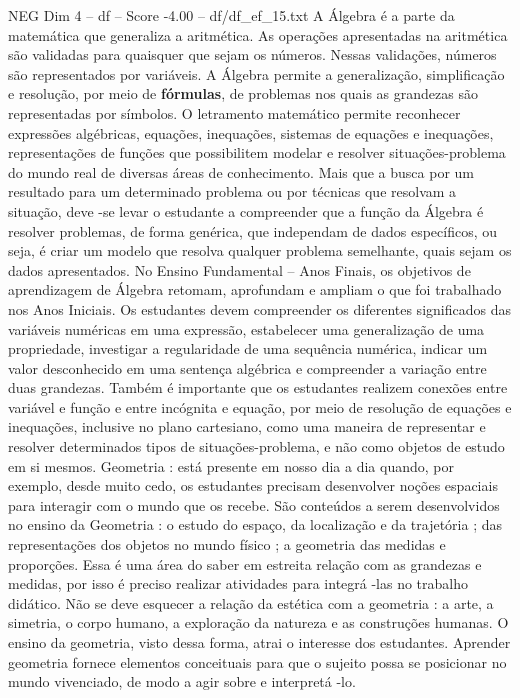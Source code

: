 \begin{textsample}{NEG Dim 4 – df – Score -4.00 – df/df\_ef\_15.txt}
A Álgebra é a parte da matemática que generaliza a aritmética.
As operações apresentadas na aritmética são validadas para quaisquer que sejam os números.
Nessas validações, números são representados por variáveis.
A Álgebra permite a generalização, simplificação e resolução, por meio de \textbf{fórmulas}, de problemas nos quais as grandezas são representadas por símbolos.
O letramento matemático permite reconhecer expressões algébricas, equações, inequações, sistemas de equações e inequações, representações de funções que possibilitem modelar e resolver situações-problema do mundo real de diversas áreas de conhecimento.
Mais que a busca por um resultado para um determinado problema ou por técnicas que resolvam a situação, deve -se levar o estudante a compreender que a função da Álgebra é resolver problemas, de forma genérica, que independam de dados específicos, ou seja, é criar um modelo que resolva qualquer problema semelhante, quais sejam os dados apresentados.
No Ensino Fundamental – Anos Finais, os objetivos de aprendizagem de Álgebra retomam, aprofundam e ampliam o que foi trabalhado nos Anos Iniciais.
Os estudantes devem compreender os diferentes significados das variáveis numéricas em uma expressão, estabelecer uma generalização de uma propriedade, investigar a regularidade de uma sequência numérica, indicar um valor desconhecido em uma sentença algébrica e compreender a variação entre duas grandezas.
Também é importante que os estudantes realizem conexões entre variável e função e entre incógnita e equação, por meio de resolução de equações e inequações, inclusive no plano cartesiano, como uma maneira de representar e resolver determinados tipos de situações-problema, e não como objetos de estudo em si mesmos.
Geometria : está presente em nosso dia a dia quando, por exemplo, desde muito cedo, os estudantes precisam desenvolver noções espaciais para interagir com o mundo que os recebe.
São conteúdos a serem desenvolvidos no ensino da Geometria : o estudo do espaço, da localização e da trajetória ; das representações dos objetos no mundo físico ; a geometria das medidas e proporções.
Essa é uma área do saber em estreita relação com as grandezas e medidas, por isso é preciso realizar atividades para integrá -las no trabalho didático.
Não se deve esquecer a relação da estética com a geometria : a arte, a simetria, o corpo humano, a exploração da natureza e as construções humanas.
O ensino da geometria, visto dessa forma, atrai o interesse dos estudantes.
Aprender geometria fornece elementos conceituais para que o sujeito possa se posicionar no mundo vivenciado, de modo a agir sobre e interpretá -lo.

\end{textsample}
